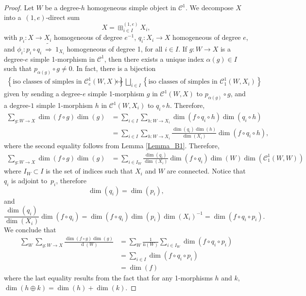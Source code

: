\documentclass[a4paper, oneside]{amsart}
\DeclareMathOperator{\wdim}{d}
\numberwithin{equation}{subsection}
\theoremstyle{referencedlemma}
\theoremstyle{plain} %
\theoremstyle{remark}
\begin{document}
\begin{proof}
Let $W$ be a degree-$h$ homogeneous simple object in $\mathcal{C}^1$.  We decompose $X$ into a~$(1,e)$-direct sum
$$
X =  \boxplus_{i\in I}^{(1,e)}X_i,
$$
with $p_i \colon X \to X_i$ homogeneous of degree $e^{-1}$, $q_i\colon X_i \to X$ homogeneous of degree $e$, and $\phi_i \colon p_i\circ q_i\ \tilde{ \Rightarrow} \ 1_{X_i}$ homogeneous of degree 1, for all $i\in I$.  If $g \colon W\to X$ is a degree-$e$ simple 1-morphism in $\mathcal{C}^1$, then there exists a unique index $\alpha(g) \in I$ such that $p_{\alpha(g)} \circ g \neq 0$. In fact, there is a bijection
\begin{align*}
\left\{\text{iso classes of simples in $\mathcal{C}_e^1(W,X)$}\right\} & \leftrightarrow  \bigsqcup_{i\in I}\left \{\text{iso classes of simples in $\mathcal{C}_1^1(W,X_i)$}\right\}
\end{align*}
given by sending a degree-$e$ simple 1-morphism $g$ in $\mathcal{C}^1(W,X)$ to $p_{\alpha(g)} \circ g$,  and a degree-$1$ simple 1-morphism $h$ in $\mathcal{C}^1(W, X_i)$ to $q_i\circ h$.  Therefore, 
\begin{align*}
\sum_{g\colon W \to X} \dim(f\circ g) \dim(g) &= \sum_{i\in I} \sum_{h\colon W\to X_i} \dim(f\circ q_i \circ h) \dim(q_i\circ h)\\
&= \sum_{i\in I} \sum_{h\colon W\to X_i} \frac{\dim(q_i) \dim(h)}{\dim(X_i)}\dim(f\circ q_i\circ h),
\end{align*}
where the second equality follows from Lemma \ref{Lemma_B1}. Therefore,
\begin{align*}
\sum_{g\colon W \to X} \dim(f\circ g) \dim(g) &= \sum_{i \in I_W} \frac{\dim(q_i)}{\dim(X_i)}\dim(f\circ q_i) \dim(W) \dim(\mathcal{C}^1_1(W,W))
\end{align*}
where $I_W \subset I$ is the set of indices such that $X_i$ and $W$ are connected.  Notice that $q_i$ is adjoint to~$p_i$, therefore 
$$
\dim(q_i) = \dim(p_i),
$$
and 
$$
\frac{\dim(q_i)}{\dim(X_i)}\dim(f\circ q_i) = \dim(f\circ q_i) \dim(p_i) \dim(X_i)^{-1} = \dim (f\circ q_i \circ p_i).
$$
We conclude that
\begin{align*}
\sum_{W}\sum_{g\colon W\to X} \frac{\dim(f\circ g)\dim(g)}{\wdim(W)} 
&= \sum_{W} \frac{1}{\mathrm{n}(W)}\sum_{i\in I_W} \dim(f\circ q_i\circ p_i)\\
&= \sum_{i\in I} \dim(f\circ q_i\circ p_i)\\
&= \dim(f)
\end{align*}
where the last equality results from the fact that for any 1-morphisms $h$ and $k$, $\dim(h\oplus k) = \dim(h) +\dim(k)$. 
\end{proof}
\end{document}
